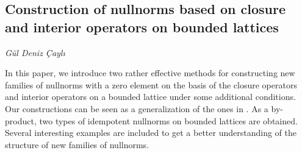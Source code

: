 \documentclass[../booklet.tex]{subfiles}
\begin{document}
\subsection[Construction of nullnorms based on closure and interior operators on bounded lattices. {\it Gül Deniz Çaylı}]{Construction of nullnorms based on closure and interior operators on bounded lattices}

\begin{center}
  {\it Gül Deniz Çaylı}
\end{center}

\vskip 0.8cm


In this paper, we introduce two rather effective methods for constructing new families of nullnorms
with a zero element on the basis of the closure operators and interior operators on a
bounded lattice under some additional conditions. Our constructions can be seen as a
generalization of the ones in \cite{wang}. As a by-product, two types of idempotent nullnorms
on bounded lattices are obtained. Several interesting examples are included to get a better
understanding of the structure of new families of nullnorms.

\end{document}
